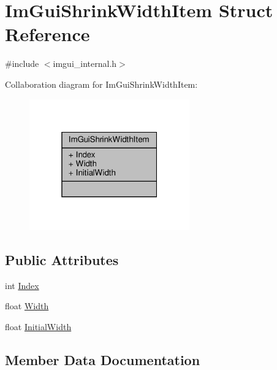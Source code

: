 \hypertarget{structImGuiShrinkWidthItem}{}\section{Im\+Gui\+Shrink\+Width\+Item Struct Reference}
\label{structImGuiShrinkWidthItem}


{\ttfamily \#include $<$imgui\+\_\+internal.\+h$>$}



Collaboration diagram for Im\+Gui\+Shrink\+Width\+Item\+:
\nopagebreak
\begin{figure}[H]
\begin{center}
\leavevmode
\includegraphics[width=196pt]{structImGuiShrinkWidthItem__coll__graph}
\end{center}
\end{figure}
\subsection*{Public Attributes}
\begin{DoxyCompactItemize}
\item 
int \hyperlink{structImGuiShrinkWidthItem_a5cd3b72ecdf53f6cb6c85f9064a4e256}{Index}
\item 
float \hyperlink{structImGuiShrinkWidthItem_a29ba0dc283a3f57b0725b371f73fe1ed}{Width}
\item 
float \hyperlink{structImGuiShrinkWidthItem_ac9a3ca20449e58374963f32db20bbd87}{Initial\+Width}
\end{DoxyCompactItemize}


\subsection{Member Data Documentation}
\mbox{\label{structImGuiShrinkWidthItem_a5cd3b72ecdf53f6cb6c85f9064a4e256}} 
